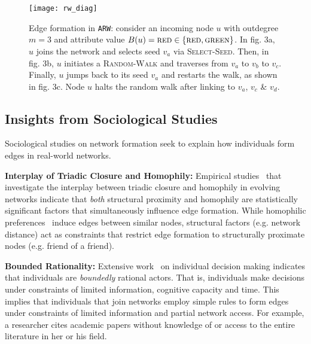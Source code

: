 

\begin{figure*}[b]
    \centering
    \texttt{[image: rw\_diag]}
    \caption{Edge formation in \texttt{ARW}: consider
    an incoming node $u$ with outdegree ${m=3}$ and attribute value {$B(u)=\textsc{red} \in \{\textsc{red},\textsc{green}\}$}.
    In fig. 3a, $u$ joins the network and selects seed $v_a$ via \textsc{Select-Seed}.
    Then, in fig. 3b, $u$ initiates a \textsc{Random-Walk} and traverses from $v_a$ to $v_b$ to $v_c$.
    Finally, $u$ jumps back to its seed $v_a$ and restarts the walk, as shown in fig. 3c.
    Node $u$ halts the random walk after linking to $v_a$, $v_c$ \& $v_d$.
    }
    \label{fig:randomwalk}
\end{figure*}


\subsection{Insights from Sociological Studies}

Sociological studies on network formation seek to explain
how individuals form edges in real-world networks.

\textbf{Interplay of Triadic Closure and Homophily:} Empirical studies~\cite{35626,block2014multidimensional} that investigate
the interplay between triadic closure and homophily in evolving networks
indicate that \textit{both} structural proximity and homophily are statistically
significant factors that simultaneously influence edge formation. While homophilic preferences~\cite{mcpherson2001birds} induce edges between similar nodes, structural factors (e.g. network distance) act as constraints that restrict edge formation to structurally proximate nodes (e.g. friend of a friend). 

\textbf{Bounded Rationality:} Extensive work~\cite{simon1972theories,gigerenzer1996reasoning,lipman1995information}
on individual decision making indicates that individuals are \textit{boundedly}
rational actors. That is, individuals make decisions under constraints of limited information, cognitive capacity and time. This implies that individuals that join networks employ simple rules to form edges under constraints of limited information and partial network access. For example, a researcher cites academic papers without knowledge of or access
to the entire literature in her or his field.

